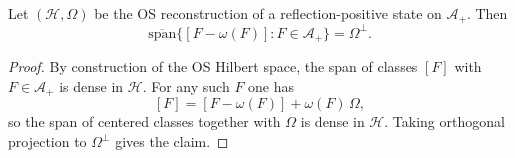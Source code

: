 \begin{lemma}\label{lem:OS_centered_dense}
Let $(\mathcal H,\Omega)$ be the OS reconstruction of a reflection-positive state on $\mathcal A_+$.
Then
\[
\overline{\mathrm{span}}\{[F-\omega(F)]:F\in\mathcal A_+\}=\Omega^\perp.
\]
\end{lemma}

\begin{proof}
By construction of the OS Hilbert space, the span of classes $[F]$ with $F\in\mathcal A_+$ is dense in $\mathcal H$.
For any such $F$ one has
\[
[F]=[F-\omega(F)]+\omega(F)\,\Omega,
\]
so the span of centered classes together with $\Omega$ is dense in $\mathcal H$.
Taking orthogonal projection to $\Omega^\perp$ gives the claim.
\end{proof}

